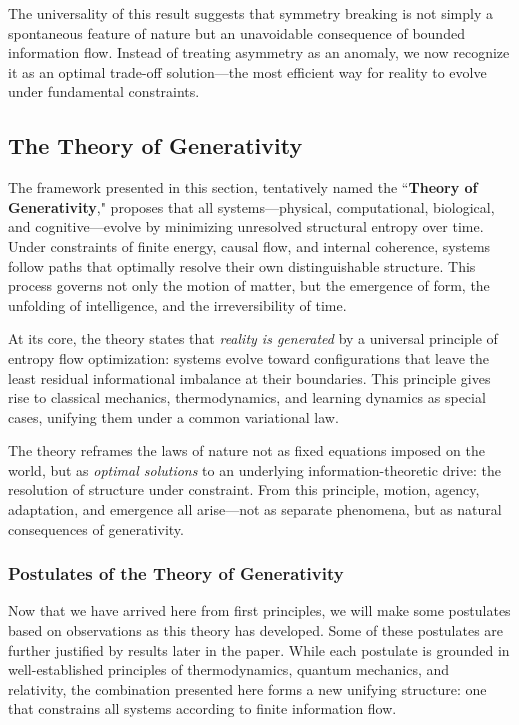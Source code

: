 \documentclass[12pt]{article}
\begin{document}
The universality of this result suggests that symmetry breaking is not simply a spontaneous feature of nature but an unavoidable consequence of bounded information flow. Instead of treating asymmetry as an anomaly, we now recognize it as an optimal trade-off solution—the most efficient way for reality to evolve under fundamental constraints.

\subsection{The Theory of Generativity}

The framework presented in this section, tentatively named the ``\textbf{Theory of Generativity}," proposes that all systems—physical, computational, biological, and cognitive—evolve by minimizing unresolved structural entropy over time. Under constraints of finite energy, causal flow, and internal coherence, systems follow paths that optimally resolve their own distinguishable structure. This process governs not only the motion of matter, but the emergence of form, the unfolding of intelligence, and the irreversibility of time.

At its core, the theory states that \emph{reality is generated} by a universal principle of entropy flow optimization: systems evolve toward configurations that leave the least residual informational imbalance at their boundaries. This principle gives rise to classical mechanics, thermodynamics, and learning dynamics as special cases, unifying them under a common variational law.

The theory reframes the laws of nature not as fixed equations imposed on the world, but as \emph{optimal solutions} to an underlying information-theoretic drive: the resolution of structure under constraint. From this principle, motion, agency, adaptation, and emergence all arise—not as separate phenomena, but as natural consequences of generativity.

\subsubsection{Postulates of the Theory of Generativity}

Now that we have arrived here from first principles, we will make some postulates based on observations as this theory has developed. Some of these postulates are further justified by results later in the paper. While each postulate is grounded in well-established principles of thermodynamics, quantum mechanics, and relativity, the combination presented here forms a new unifying structure: one that constrains all systems according to finite information flow.
\end{document}
